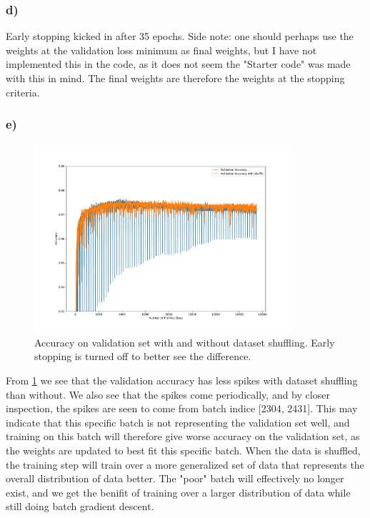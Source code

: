 \subsubsection*{d)}

Early stopping kicked in after 35 epochs. Side note: one should perhaps use the weights at the validation loss minimum as final weights, but I have not implemented this in the code, as it does not seem the "Starter code" was made with this in mind. The final weights are therefore the weights at the stopping criteria.

\subsubsection*{e)}

\begin{figure}[h!]
    \centering
    \includegraphics[clip, trim=0cm 0cm 0cm 0cm,width=0.85\textwidth]{figures/Task2e.pdf}
    \caption{Accuracy on validation set with and without dataset shuffling. Early stopping is turned off to better see the difference.}
    \label{fig:task2:shuffle}
\end{figure}

From \cref{fig:task2:shuffle} we see that the validation accuracy has less spikes with dataset shuffling than without. We also see that the spikes come periodically, and by closer inspection, the spikes are seen to come from batch indice [2304, 2431]. This may indicate that this specific batch is not representing the validation set well, and training on this batch will therefore give worse accuracy on the validation set, as the weights are updated to best fit this specific batch. When the data is shuffled, the training step will train over a more generalized set of data that represents the overall distribution of data better. The "poor" batch will effectively no longer exist, and we get the benifit of training over a larger distribution of data while still doing batch gradient descent.
